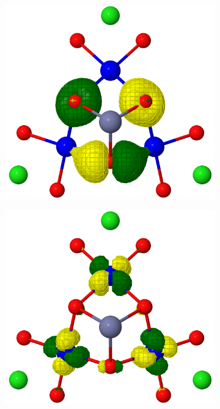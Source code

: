 \documentclass[12pt]{report}
\numberwithin{equation}{section}
\begin{document}
\begin{figure}
\begin{subfigure}{0.3\linewidth}
		\label{fig:subfigB}
	\end{subfigure}
	\begin{subfigure}{0.3\linewidth}
	        \includegraphics[width=\linewidth]{Images/mo3.trimer.png}
	        \label{fig:subfigC}
         \end{subfigure}
	\label{fig:OrbP96}
    \caption*{Bridging orbitals from the CAS(9,6) calculation.}
    \begin{subfigure}{0.3\linewidth}
        \includegraphics[width=\linewidth]{Images/mo4.trimer.png}

\end{subfigure}
\end{figure}
\end{document}
